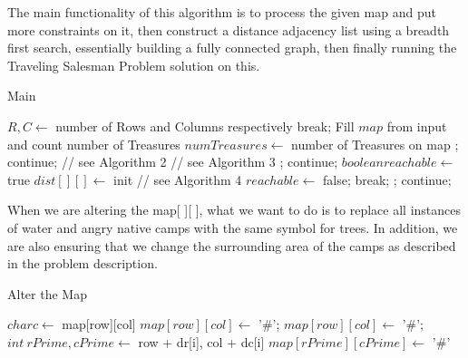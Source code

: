 \documentclass[12pt]{article}
\begin{document}
The main functionality of this algorithm is to process the given map and put more constraints on it, then
construct a distance adjacency list using a breadth first search, essentially building a fully connected
graph, then finally running the Traveling Salesman Problem solution on this.

\begin{algorithm}[H]
\caption{Main}
\begin{algorithmic}
            \State $R, C \gets$ number of Rows and Columns respectively
                break;
            \EndIf
            \State Fill $map$ from input and count number of Treasures
            \State $numTreasures \gets$ number of Treasures on map
                \State {}; continue;
            \EndIf
            \State {}  // see Algorithm 2
             // see Algorithm 3
                \State {}; continue;
            \Else
                \State $boolean reachable \gets$ true
                \State $dist[][] \gets$ init
                      // see Algorithm 4
                        \State $reachable \gets$ false; break;
                    \EndIf
                \EndFor
                    \State {}; continue;
                \EndIf
            \EndIf
        \EndWhile
    \EndProcedure
\end{algorithmic}
\end{algorithm}

When we are altering the map[ ][ ], what we want to do is to replace all instances of water and
angry native camps with the same symbol for trees. In addition, we are also ensuring that we
change the surrounding area of the camps as described in the problem description.

\begin{algorithm}[H]
\caption{Alter the Map}
\begin{algorithmic}
            \State $char c \gets$ map[row][col]
                $map[row][col] \gets$ '\#';
                \State $map[row][col] \gets$ '\#';
                    \State $int\ rPrime, cPrime \gets$ row + dr[i], col + dc[i]
                        \State $map[rPrime][cPrime] \gets$ '\#'
                    \EndIf
                \EndFor
            \EndIf
        \EndFor
    \EndProcedure
\end{algorithmic}
\end{algorithm}
\end{document}
